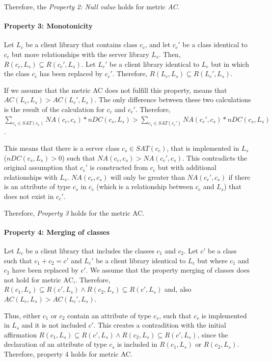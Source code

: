  Therefore, the \textit{Property 2: Null value} holds for metric \textit{AC}.

\paragraph{Property 3: Monotonicity}
Let $L_c$ be a client library that contains class $c_c$, and let $c_c'$ be a class identical to $c_c$ but more relationships with the server library $L_s$. Then, $R(c_c, L_s) \subseteq R(c_c', L_s)$. Let $L_c'$ be a client library identical to $L_c$ but in which the class $c_c$ has been replaced by $c_c'$. Therefore, $R(L_c, L_s) \subseteq R(L_c', L_s)$.

If we assume that the metric AC does not fulfill this property, means that $AC(L_c, L_s) > AC(L_c', L_s)$. The only difference between these two calculations is the result of the calculation for $c_c$ and $c_c'$. Therefore, $\sum_{c_s \in SAT(c_c)} NA(c_c, c_s) * nDC(c_s, L_s) > \sum_{c_s \in SAT(c_c')} NA(c_c', c_s) * nDC(c_s, L_s)$.

This means that there is a server class $c_s \in SAT(c_c)$, that is implemented in $L_s$ ($nDC(c_s, L_s) > 0$) such that $NA(c_c, c_s) > NA(c_c', c_s)$. This contradicts the original assumption that $c_c'$ is constructed from $c_c$ but with additional relationships with $L_s$. $NA(c_c, c_s)$ will only be greater than $NA(c_c', c_s)$ if there is an attribute of type $c_s$ in $c_c$ (which is a relationship between $c_c$ and $L_s$) that does not exist in $c_c'$.

Therefore, \textit{Property 3} holds for the metric AC.

\paragraph{Property 4: Merging of classes}
Let $L_c$ be a client library that includes the classes $c_1$ and $c_2$. Let $c'$ be a class such that $c_1 + c_2 = c'$ and $L_c'$ be a client library identical to $L_c$ but where $c_1$ and $c_2$ have been replaced by $c'$. We assume that the property merging of classes does not hold for metric AC,. Therefore, $R(c_1, L_s) \subseteq R(c', L_s) \land R(c_2, L_s) \subseteq R(c', L_s)$ and, also $AC(L_c, L_s) > AC(L_c', L_s)$.

Thus, either $c_1$ or $c_2$ contain an attribute of type $c_s$, such that $c_s$ is implemented in $L_s$ and it is not included $c'$. This creates a contradition with the initial affirmation $R(c_1, L_s) \subseteq R(c', L_s) \land R(c_2, L_s) \subseteq R(c', L_s)$, since the declaration of an attribute of type $c_s$ is included in $R(c_1, L_s)$ or $R(c_2, L_s)$. Therefore, property 4 holds for metric AC.

